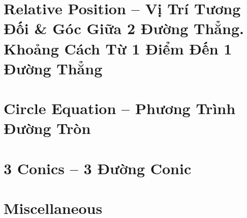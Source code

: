 \documentclass{article}
\begin{document}
\section{Relative Position -- Vị Trí Tương Đối \& Góc Giữa 2 Đường Thẳng. Khoảng Cách Từ 1 Điểm Đến 1 Đường Thẳng}


\section{Circle Equation -- Phương Trình Đường Tròn}


\section{3 Conics -- 3 Đường Conic}


\section{Miscellaneous}


\printbibliography[heading=bibintoc]
	
\end{document}
